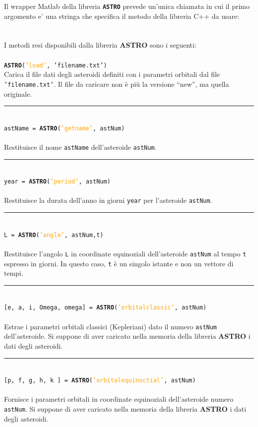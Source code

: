 \documentclass[12pt]{article}
\newcommand\method[1]{\textcolor{Orange}{#1}}
\newcommand\class[1]{\textcolor{NavyBlue}{\textbf{#1}}}
\newcommand{\HRule}{\rule{\linewidth}{0.1mm}}
\begin{document}
Il wrapper Matlab della libreria {\tt \textbf{\textbf{ASTRO}}} prevede un'unica chiamata in cui il primo argomento e' una stringa che specifica il metodo della libreria C++ da usare:
\\
\\
\\
I metodi resi disponibili dalla libreria \textbf{\textbf{ASTRO}} sono i seguenti: 
\\
\\
{\tt \class{ASTRO}(\method{'load'}, 'filename.txt')}\\
Carica il file dati degli asteroidi definiti con i parametri orbitali dal file {\tt 'filename.txt'}. Il file da caricare non è più la versione ``new'', ma quella originale.
\\
\HRule
\\
{\tt astName = \class{ASTRO}(\method{'getname'}, astNum)}\\
\\Restituisce il nome {\tt astName} dell'asteroide {\tt astNum}.
\\
\HRule
\\
{\tt year = \class{ASTRO}(\method{'period'}, astNum)}\\
\\Restituisce la durata dell'anno in giorni {\tt year} per l'asteroide {\tt astNum}.
\\
\HRule
\\
{\tt L = \class{ASTRO}(\method{'angle'}, astNum,t)}\\
\\Restituisce l'angolo {\tt L} in coordinate equinoziali dell'asteroide {\tt astNum} al tempo {\tt t} espresso in giorni. In questo caso, {\tt t} è un singolo istante e non un vettore di tempi.
\\
\HRule
\\
{\tt [e, a, i, Omega, omega] = \class{ASTRO}(\method{'orbitalclassic'}, astNum)}\\
\\Estrae i parametri orbitali classici (Kepleriani) dato il numero {\tt astNum} dell'asteroide. Si suppone di aver caricato nella memoria della libreria \textbf{\textbf{ASTRO}} i dati degli asteroidi.
\\
\HRule
\\
{\tt [p, f, g, h, k ] = \class{ASTRO}(\method{'orbitalequinoctial'}, astNum)}\\
\\Fornisce i parametri orbitali in coordinate equinoziali dell'asteroide numero {\tt astNum}. Si suppone di aver caricato nella memoria della libreria \textbf{\textbf{ASTRO}} i dati degli asteroidi.
\end{document}

